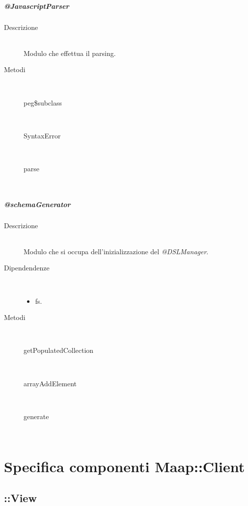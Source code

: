 \subparagraph{@JavascriptParser}
\begin{description}
 \item[Descrizione] \hfill \\
  Modulo che effettua il parsing.
  
 \item[Metodi] \hfill \\
 \begin{description}
 \item[peg\$subclass] \hfill \\ 
 \item[SyntaxError] \hfill \\
 \item[parse] \hfill \\
 \end{description}
 
\end{description}
\subparagraph{@schemaGenerator}
\begin{description}
 \item[Descrizione] \hfill \\
  Modulo che si occupa dell'inizializzazione del \textit{@DSLManager}.
 \item[Dipendendenze] \hfill \\
 \begin{itemize}
  \item{fs}.
 \end{itemize}
  
 \item[Metodi] \hfill \\
 \begin{description}
 \item[getPopulatedCollection] \hfill \\ 
 \item[arrayAddElement] \hfill \\ 
 \item[generate] \hfill \\ 
 \end{description}
 
\end{description}

\section{Specifica componenti Maap::Client}

\subsection{::View}

